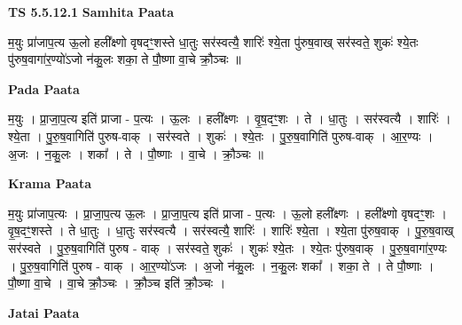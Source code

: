 \documentclass[17pt]{extarticle}
\begin{document}
\textbf{TS 5.5.12.1 } \newline
\textbf{Samhita Paata} \newline

म॒युः प्रा॑जाप॒त्य ऊ॒लो हली᳚क्ष्णो वृषदꣳ॒॒शस्ते धा॒तुः सर॑स्वत्यै॒ शारिः॑ श्ये॒ता पु॑रुष॒वाख् सर॑स्वते॒ शुकः॑ श्ये॒तः पु॑रुष॒वागा॑र॒ण्यो॑ऽजो न॑कु॒लः शका॒ ते पौ॒ष्णा वा॒चे क्रौ॒ञ्चः ॥ \newline

\textbf{Pada Paata} \newline

म॒युः । प्रा॒जा॒प॒त्य इति॑ प्राजा - प॒त्यः । ऊ॒लः । हली᳚क्ष्णः । वृ॒ष॒दꣳ॒॒शः । ते । धा॒तुः । सर॑स्वत्यै । शारिः॑ । श्ये॒ता । पु॒रु॒ष॒वागिति॑ पुरुष-वाक् । सर॑स्वते । शुकः॑ । श्ये॒तः । पु॒रु॒ष॒वागिति॑ पुरुष-वाक् । आ॒र॒ण्यः । अ॒जः । न॒कु॒लः । शका᳚ । ते । पौ॒ष्णाः । वा॒चे । क्रौ॒ञ्चः ॥  \newline


\textbf{Krama Paata} \newline

म॒युः प्रा॑जाप॒त्यः । प्रा॒जा॒प॒त्य ऊ॒लः । प्रा॒जा॒प॒त्य इति॑ प्राजा - प॒त्यः । ऊ॒लो हली᳚क्ष्णः । हली᳚क्ष्णो वृषदꣳ॒॒शः । वृ॒ष॒दꣳ॒॒शस्ते । ते धा॒तुः । धा॒तुः सर॑स्वत्यै । सर॑स्वत्यै॒ शारिः॑ । शारिः॑ श्ये॒ता । श्ये॒ता पु॑रुष॒वाक् । पु॒रु॒ष॒वाख् सर॑स्वते । पु॒रु॒ष॒वागिति॑ पुरुष - वाक् । सर॑स्वते॒ शुकः॑ । शुकः॑ श्ये॒तः । श्ये॒तः पु॑रुष॒वाक् । पु॒रु॒ष॒वागा॑र॒ण्यः । पु॒रु॒ष॒वागिति॑ पुरुष - वाक् । आ॒र॒ण्यो॑ऽजः । अ॒जो न॑कु॒लः । न॒कु॒लः शका᳚ । शका॒ ते । ते पौ॒ष्णाः । पौ॒ष्णा वा॒चे । वा॒चे क्रौ॒ञ्चः । क्रौ॒ञ्च इति॑ क्रौ॒ञ्चः । \newline

\textbf{Jatai Paata} \newline
\end{document}
